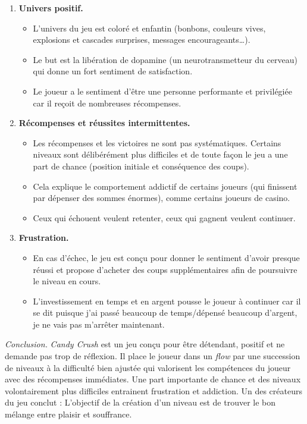 \documentclass[11pt,class=report,crop=false]{standalone}
\begin{document}
\begin{enumerate}
\begin{itemize}
	\end{itemize}
	
	\item \textbf{Univers positif.}	
	\begin{itemize}
		\item L'univers du jeu est coloré et enfantin (bonbons, couleurs vives, explosions et cascades surprises, messages encourageants\ldots).
		\item Le but est la libération de dopamine (un neurotransmetteur du cerveau) qui donne un fort sentiment de satisfaction.
		\item Le joueur a le sentiment d'être une personne performante et privilégiée car il reçoit de nombreuses récompenses.
	\end{itemize}
	
	\item \textbf{Récompenses et réussites intermittentes.}	
	\begin{itemize}
		\item Les récompenses et les victoires ne sont pas systématiques. Certains niveaux sont délibérément plus difficiles et de toute façon le jeu a une part de chance (position initiale et conséquence des coups). 
		
		\item Cela explique le comportement addictif de certains joueurs (qui finissent par dépenser des sommes énormes), comme certains joueurs de casino.
		
		\item Ceux qui échouent veulent retenter, ceux qui gagnent veulent continuer.
	\end{itemize}
	
	\item \textbf{Frustration.}	
	\begin{itemize}
		\item En cas d'échec, le jeu est conçu pour donner le sentiment d'avoir \og{}presque réussi\fg{} et propose d'acheter des coups supplémentaires afin de poursuivre le niveau en cours.
		
		\item L'investissement en temps et en argent pousse le joueur à continuer car il se dit \og{}puisque j'ai passé beaucoup de temps/dépensé beaucoup d'argent, je ne vais pas m'arrêter maintenant\fg{}.				
	\end{itemize}
\end{enumerate}

\emph{Conclusion.} \emph{Candy Crush} est un jeu conçu pour être détendant, positif et ne demande pas trop de réflexion. Il place le joueur dans un \emph{flow} par une succession de niveaux à la difficulté bien ajustée qui valorisent les compétences du joueur avec des récompenses immédiates. Une part importante de chance et des niveaux volontairement plus difficiles entrainent frustration et addiction. Un des créateurs du jeu  conclut : \og{}L'objectif de la création d'un niveau est de trouver le bon mélange entre plaisir et souffrance.\fg{}
\end{document}
